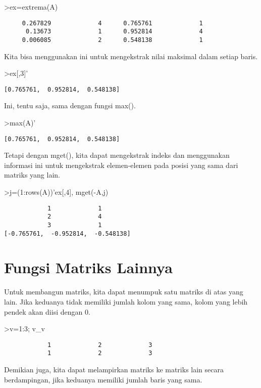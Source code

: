 \documentclass[
]{book}
\begin{document}
\textgreater ex=extrema(A)

\begin{verbatim}
     0.267829             4      0.765761             1 
      0.13673             1      0.952814             4 
     0.006085             2      0.548138             1 
\end{verbatim}

Kita bisa menggunakan ini untuk mengekstrak nilai maksimal dalam setiap baris.

\textgreater ex{[},3{]}'

\begin{verbatim}
[0.765761,  0.952814,  0.548138]
\end{verbatim}

Ini, tentu saja, sama dengan fungsi max().

\textgreater max(A)'

\begin{verbatim}
[0.765761,  0.952814,  0.548138]
\end{verbatim}

Tetapi dengan mget(), kita dapat mengekstrak indeks dan menggunakan informasi ini untuk mengekstrak elemen-elemen pada posisi yang sama dari matriks yang lain.

\textgreater j=(1:rows(A))'\textbar ex{[},4{]}, mget(-A,j)

\begin{verbatim}
            1             1 
            2             4 
            3             1 
[-0.765761,  -0.952814,  -0.548138]
\end{verbatim}

\chapter{Fungsi Matriks Lainnya}\label{fungsi-matriks-lainnya}

Untuk membangun matriks, kita dapat menumpuk satu matriks di atas yang lain. Jika keduanya tidak memiliki jumlah kolom yang sama, kolom yang lebih pendek akan diisi dengan 0.

\textgreater v=1:3; v\_v

\begin{verbatim}
            1             2             3 
            1             2             3 
\end{verbatim}

Demikian juga, kita dapat melampirkan matriks ke matriks lain secara berdampingan, jika keduanya memiliki jumlah baris yang sama.
\end{document}
